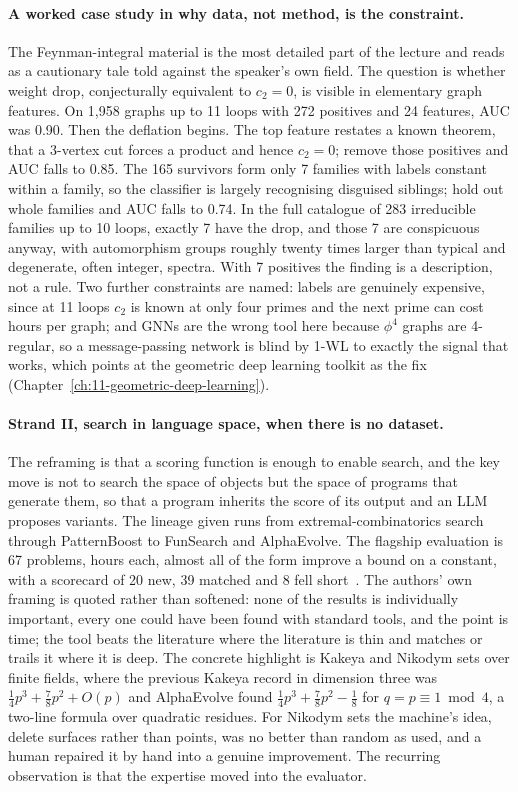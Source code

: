 \paragraph{A worked case study in why data, not method, is the constraint.} The Feynman-integral
material is the most detailed part of the lecture and reads as a cautionary tale told against
the speaker's own field. The question is whether weight drop, conjecturally equivalent to
$c_2 = 0$, is visible in elementary graph features. On 1,958 graphs up to 11 loops with 272
positives and 24 features, AUC was 0.90. Then the deflation begins. The top feature restates a
known theorem, that a 3-vertex cut forces a product and hence $c_2 = 0$; remove those positives
and AUC falls to 0.85. The 165 survivors form only 7 families with labels constant within a
family, so the classifier is largely recognising disguised siblings; hold out whole families and
AUC falls to 0.74. In the full catalogue of 283 irreducible families up to 10 loops, exactly 7
have the drop, and those 7 are conspicuous anyway, with automorphism groups roughly twenty times
larger than typical and degenerate, often integer, spectra. With 7 positives the finding is a
description, not a rule. Two further constraints are named: labels are genuinely expensive, since
at 11 loops $c_2$ is known at only four primes and the next prime can cost hours per graph; and
GNNs are the wrong tool here because $\phi^4$ graphs are 4-regular, so a message-passing network
is blind by 1-WL to exactly the signal that works, which points at the geometric deep learning
toolkit as the fix (Chapter~\ref{ch:11-geometric-deep-learning}).

\paragraph{Strand II, search in language space, when there is no dataset.} The reframing is that
a scoring function is enough to enable search, and the key move is not to search the space of
objects but the
space of programs that generate them, so that a program inherits the score of its output and an
LLM proposes variants. The lineage given runs from extremal-combinatorics search through
PatternBoost to FunSearch and AlphaEvolve. The flagship evaluation is 67 problems, hours each,
almost all of the form improve a bound on a constant, with a scorecard of 20 new, 39 matched and
8 fell short~\citep{georgiev2025}. The authors' own framing is quoted rather than softened: none
of the results is individually important, every one could have been found with standard tools, and
the point is time; the tool beats the literature where the literature is thin and matches or
trails it where it is deep. The concrete highlight is Kakeya and Nikodym sets over finite fields,
where the previous Kakeya record in dimension three was
$\tfrac14 p^3 + \tfrac78 p^2 + O(p)$ and AlphaEvolve found
$\tfrac14 p^3 + \tfrac78 p^2 - \tfrac18$ for $q = p \equiv 1 \bmod 4$, a two-line formula over
quadratic residues. For Nikodym sets the machine's idea, delete surfaces rather than points, was
no better than random as used, and a human repaired it by hand into a genuine improvement. The
recurring observation is that the expertise moved into the evaluator.

